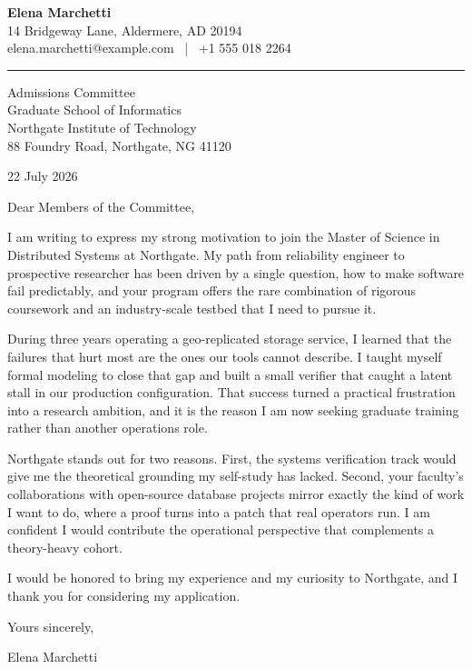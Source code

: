 \documentclass[11pt]{article}
\begin{document}
{\large\bfseries Elena Marchetti}\\
{\color{accent} 14 Bridgeway Lane, Aldermere, AD 20194}\\
elena.marchetti@example.com \, | \, +1 555 018 2264

\vspace{1.2em}
{\color{accent}\rule{\textwidth}{0.5pt}}
\vspace{1.0em}

Admissions Committee\\
Graduate School of Informatics\\
Northgate Institute of Technology\\
88 Foundry Road, Northgate, NG 41120

\vspace{0.6em}
22 July 2026

\vspace{0.6em}
Dear Members of the Committee,

I am writing to express my strong motivation to join the Master of Science in
Distributed Systems at Northgate. My path from reliability engineer to
prospective researcher has been driven by a single question, how to make
software fail predictably, and your program offers the rare combination of
rigorous coursework and an industry-scale testbed that I need to pursue it.

During three years operating a geo-replicated storage service, I learned that
the failures that hurt most are the ones our tools cannot describe. I taught
myself formal modeling to close that gap and built a small verifier that caught
a latent stall in our production configuration. That success turned a practical
frustration into a research ambition, and it is the reason I am now seeking
graduate training rather than another operations role.

Northgate stands out for two reasons. First, the systems verification track
would give me the theoretical grounding my self-study has lacked. Second, your
faculty's collaborations with open-source database projects mirror exactly the
kind of work I want to do, where a proof turns into a patch that real operators
run. I am confident I would contribute the operational perspective that
complements a theory-heavy cohort.

I would be honored to bring my experience and my curiosity to Northgate, and I
thank you for considering my application.

\vspace{0.8em}
Yours sincerely,

\vspace{1.4em}
Elena Marchetti
\end{document}
